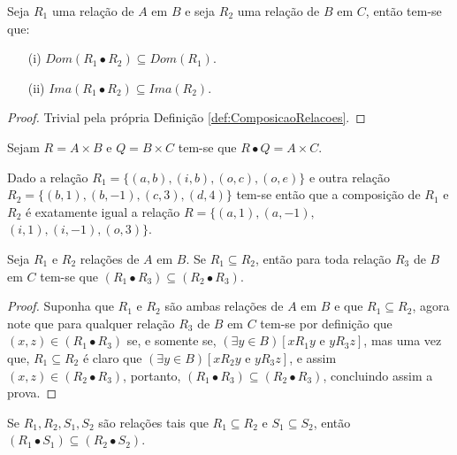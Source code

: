 \begin{proposicao}
  Seja $R_1$ uma relação de $A$ em $B$ e seja $R_2$ uma relação de $B$ em $C$, então tem-se que:
	\begin{itemize}
		\item[(i)] $Dom(R_1 \bullet R_2) \subseteq Dom(R_1)$.
		\item[(ii)] $Ima(R_1 \bullet R_2) \subseteq Ima(R_2)$.
	\end{itemize}
\end{proposicao}

\begin{proof}
	Trivial pela própria Definição \ref{def:ComposicaoRelacoes}.
\end{proof}

\begin{exemplo}
	Sejam $R = A \times B$ e $Q = B \times C$ tem-se que $R \bullet Q = A \times C$.
\end{exemplo}

\begin{exemplo}
	Dado a relação $R_1 = \{(a, b), (i, b), (o, c), (o, e)\}$ e outra relação $R_2 = \{(b, 1), (b, -1), (c, 3), (d, 4)\}$ tem-se então que a composição de $R_1$ e $R_2$ é exatamente igual a relação $R = \{(a, 1), (a, -1),$ $(i, 1), (i, -1), (o, 3)\}$.
\end{exemplo}

\begin{teorema}\label{teo:MonotonicidadeComposicaoRelacoes}
	Seja $R_1$ e $R_2$ relações de $A$ em $B$. Se $R_1 \subseteq R_2$, então para toda relação $R_3$ de $B$ em $C$ tem-se que $(R_1 \bullet R_3) \subseteq (R_2 \bullet R_3)$.
\end{teorema}

\begin{proof}
	Suponha que $R_1$ e $R_2$ são ambas relações de $A$ em $B$ e que $R_1 \subseteq R_2$, agora note que para qualquer relação $R_3$ de $B$ em $C$ tem-se por definição que $(x, z) \in (R_1 \bullet R_3)$ se, e somente se, $(\exists y \in B)[x\mathrel{R_1}y \text{ e } y\mathrel{R_3}z]$, mas uma vez que, $R_1 \subseteq R_2$ é claro que $ (\exists y \in B)[x \mathrel{R_2}y \text{ e } y\mathrel{R_3}z]$, e assim $(x, z) \in (R_2 \bullet R_3)$, portanto, $(R_1 \bullet R_3) \subseteq (R_2 \bullet R_3)$, concluindo assim a prova.
\end{proof}

\begin{corolario}\label{col:MonotonicidadeComposicaoRelacoes}
	Se $R_1, R_2, S_1, S_2$ são relações tais que $R_1 \subseteq R_2$ e $S_1 \subseteq S_2$, então $(R_1 \bullet S_1) \subseteq (R_2 \bullet S_2)$.
\end{corolario}


